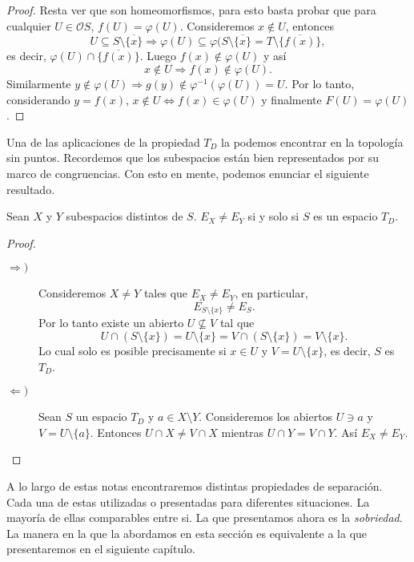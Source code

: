 \begin{proof}
    \noindent
    Resta ver que son homeomorfismos, para esto basta probar que para cualquier $U\in \mathcal{O}S$, $f(U)=\varphi(U)$. Consideremos $x\notin U$, entonces
    \[
    U\subseteq S\setminus \overline{\{x\}}\Rightarrow \varphi(U)\subseteq \varphi(S\setminus\overline{\{x\}}=T\setminus \overline{\{f(x)\}},
    \]
    es decir, $\varphi(U)\cap \overline{\{f(x)\}}$. Luego $f(x)\notin \varphi(U)$ y así 
    \[
    x\notin U \Rightarrow f(x)\notin \varphi (U).
    \]
    Similarmente $y\notin\varphi(U)\Rightarrow g(y)\notin \varphi^{-1}(\varphi(U))=U$. Por lo tanto, considerando $y=f(x)$, $x\notin U\Leftrightarrow f(x)\in \varphi(U)$ y finalmente $F(U)=\varphi(U)$.
    \end{proof}

Una de las aplicaciones de la propiedad $T_D$ la podemos encontrar en la topología sin puntos. Recordemos que los subespacios están bien representados por su marco de congruencias. Con esto en mente, podemos enunciar el siguiente resultado.

\begin{thm}
    Sean $X$ y $Y$ subespacios distintos de $S$. $E_X\neq E_Y$ si y solo si $S$ es un espacio $T_D$.
\end{thm}

\begin{proof}
    \begin{description}
        \item[$\Rightarrow )$] Consideremos $X\neq Y$ tales que $E_X\neq E_Y$, en particular, 
        \[
        E_{S\setminus \{x\}}\neq E_S.
        \]
        Por lo tanto existe un abierto $U\nsubseteq V$ tal que 
        \[
        U\cap (S\setminus \{x\})=U\setminus\{x\}=V\cap (S\setminus \{x\})=V\setminus\{x\}.
        \]
        Lo cual solo es posible precisamente si $x\in U$ y $V=U\setminus \{x\}$, es decir, $S$ es $T_D$.
        \item[$\Leftarrow )$] Sean $S$ un espacio $T_D$ y $a\in X\setminus Y$. Consideremos los abiertos $U\ni a$ y $V=U\setminus\{a\}$. Entonces $U\cap X\neq V\cap X$ mientras $U\cap Y=V\cap Y$. Así $E_X\neq E_Y$. 
    \end{description}
\end{proof}

A lo largo de estas notas encontraremos distintas propiedades de separación. Cada una de estas utilizadas o presentadas para diferentes situaciones. La mayoría de ellas comparables entre si. La que presentamos ahora es la \emph{sobriedad}. La manera en la que la abordamos en esta sección es equivalente a la que presentaremos en el siguiente capítulo.\\

